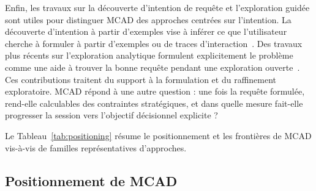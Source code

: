 \documentclass[journal]{IEEEtran}
\begin{document}
Enfin, les travaux sur la découverte d'intention de requête et l'exploration guidée sont utiles pour distinguer MCAD des approches centrées sur l'intention. La découverte d'intention à partir d'exemples vise à inférer ce que l'utilisateur cherche à formuler à partir d'exemples ou de traces d'interaction~\cite{TaramadIntent2022}. Des travaux plus récents sur l'exploration analytique formulent explicitement le problème comme une aide à trouver la bonne requête pendant une exploration ouverte~\cite{ArenasExploratory2025}. Ces contributions traitent du support à la formulation et du raffinement exploratoire. MCAD répond à une autre question : une fois la requête formulée, rend-elle calculables des contraintes stratégiques, et dans quelle mesure fait-elle progresser la session vers l'objectif décisionnel explicite ?

Le Tableau~\ref{tab:positioning} résume le positionnement et les frontières de MCAD vis-à-vis de familles représentatives d'approches.

\subsection{Positionnement de MCAD}
\end{document}
